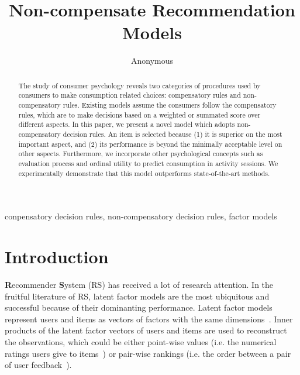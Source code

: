 \documentclass[conference]{IEEEtran}
\begin{document}
\title{Non-compensate Recommendation Models
}

\author{Anonymous
}

\maketitle

\begin{abstract}
The study of consumer psychology reveals two categories of procedures used by consumers to make consumption related choices: compensatory rules and non-compensatory rules. Existing models assume the consumers follow the compensatory rules, which are to make decisions based on a weighted or summated score over different aspects. In this paper, we present a novel model which adopts non-compensatory decision rules. An item is selected because  (1) it is superior on the most important aspect, and (2) its performance is beyond the minimally acceptable level on other aspects. Furthermore, we incorporate other psychological concepts such as evaluation process and ordinal utility to predict consumption in activity sessions. We experimentally demonstrate that this model outperforms state-of-the-art methods.
\end{abstract}

\begin{IEEEkeywords}
conpensatory decision rules, non-compensatory decision rules, factor models 
\end{IEEEkeywords}

\section{Introduction}\label{sec:introduction}
\textbf{R}ecommender \textbf{S}ystem (RS) has received a lot of research attention. In the fruitful literature of RS, latent factor models are the most ubiquitous and successful because of their dominanting performance. Latent factor models represent users and items as vectors of factors with the same dimensions~\cite{Gopalan2015Scalable,Hu2008Collaborative}. Inner products of the latent factor vectors of users and items are used to reconstruct the observations, which could be either point-wise values (i.e. the numerical ratings users give to items~\cite{}) or pair-wise rankings (i.e. the order between a pair of user feedback~\cite{}).
\end{document}
